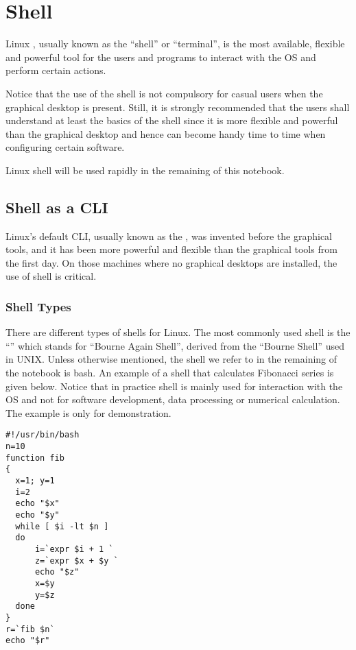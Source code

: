\chapter{Shell} \label{ch:sb}

{Linux , usually known as the ``shell'' or ``terminal'', is the most available, flexible and powerful tool for the users and programs to interact with the OS and perform certain actions.

Notice that the use of the shell is not compulsory for casual users when the graphical desktop is present. Still, it is strongly recommended that the users shall understand at least the basics of the shell since it is more flexible and powerful than the graphical desktop and hence can become handy time to time when configuring certain software.

Linux shell will be used rapidly in the remaining of this notebook.

\section{Shell as a CLI}

Linux's default CLI, usually known as the , was invented before the graphical tools, and it has been more powerful and flexible than the graphical tools from the first day. On those machines where no graphical desktops are installed, the use of shell is critical.

\subsection{Shell Types}

There are different types of shells for Linux. The most commonly used shell is the ``'' which stands for ``Bourne Again Shell'', derived from the ``Bourne Shell'' used in UNIX. Unless otherwise mentioned, the shell we refer to in the remaining of the notebook is bash. An example of a shell that calculates Fibonacci series is given below. Notice that in practice shell is mainly used for interaction with the OS and not for software development, data processing or numerical calculation. The example is only for demonstration.

\begin{lstlisting}
#!/usr/bin/bash
n=10
function fib
{
  x=1; y=1
  i=2
  echo "$x"
  echo "$y"
  while [ $i -lt $n ]
  do
      i=`expr $i + 1 `
      z=`expr $x + $y `
      echo "$z"
      x=$y
      y=$z
  done
}
r=`fib $n`
echo "$r"
\end{lstlisting}

}
